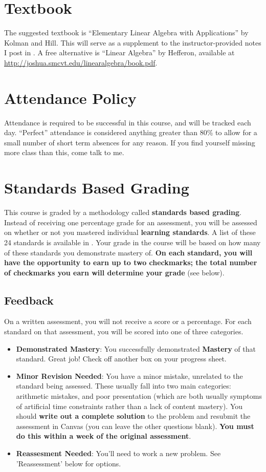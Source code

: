 \documentclass{article}
\begin{document}
\section*{\fontsize{12}{15}\selectfont Textbook}
The suggested textbook is ``Elementary Linear Algebra with Applications'' by Kolman and Hill.  This will serve as a supplement to the instructor-provided notes I post in \LMS.  A free alternative is ``Linear Algebra'' by Hefferon, available at \url{http://joshua.smcvt.edu/linearalgebra/book.pdf}.


\section*{\fontsize{12}{15}\selectfont Attendance Policy}
Attendance is required to be successful in this course, and will be tracked each day.
``Perfect'' attendance is considered anything greater than 80\%
to allow for a small number of short term absences for any reason.
If you find yourself missing more class than this, come talk to me.


\section*{\fontsize{12}{15}\selectfont Standards Based Grading}
This course is graded by a methodology called {\bf standards based grading}.  Instead of receiving one percentage grade for an assessment, you will be assessed on whether or not you mastered individual {\bf learning standards}.  A list of these 24 standards is available in \LMS.  Your grade in the course will be based on how many of these standards you demonstrate mastery of.  {\bf On each standard, you will have the opportunity to earn up to two checkmarks; the total number of checkmarks you earn will determine your grade} (see below).



    \subsection*{\fontsize{10}{12}\selectfont Feedback}
    On a written assessment, you will not receive a score or a percentage.  For each standard on that assessment, you will be scored into one of three categories.
\begin{itemize}
    \item \textbf{Demonstrated Mastery}: You successfully demonstrated {\bf Mastery} of that standard.  Great job!  Check off another box on your progress sheet.
    \item \textbf{Minor Revision Needed}: You have a minor mistake, unrelated to the standard being assessed.  These usually fall into two main categories: arithmetic mistakes, and poor presentation (which are both usually symptoms of artificial time constraints rather than a lack of content mastery).  You should {\bf write out a complete solution} to the problem and resubmit the assessment in Canvas (you can leave the other questions blank). \textbf{You must do this within a week of the original assessment}.    
    \item \textbf{Reassesment Needed}: You'll need to work a new problem. See 'Reassessment' below for options.
    \end{itemize}
\end{document}
